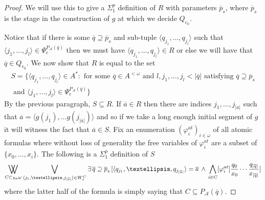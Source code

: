 \documentclass[10pt,a4paper]{amsart}
\newcommand{\A}{{\mathcal{A}}}
\newcommand{\B}{{\mathcal{B}}}
\renewcommand{\bar}[1]{\overline{#1}}
\DeclareMathOperator*{\bigdoublevee}{\bigvee\mkern-15mu\bigvee}
\renewcommand{\phi}{\varphi}
\begin{document}
\begin{proof}
We will use this to give a $\Sigma^p_1$ definition of $R$ with parameters $\bar p_{s}$, where $\bar p_{s}$ is the stage in the construction of $g$ at which we decide $Q_{e_0}$.

Notice that if there is some $\bar q \supseteq \bar p_s$ and sub-tuple $\langle q_{j_1} , \dots, q_{j_l} \rangle$ such that $\langle j_1,\dots , j_l \rangle \in \Psi_e^{P_\A(\overline{q})}$ then we must have $\langle q_{j_1} , \dots, q_{j_l} \rangle \in R$ or else we will have that $\bar q \in Q_{e_0}$. We now show that $R$ is equal to the set
\begin{align*}
    S = \{ \langle q_{j_1},\dots , q_{j_l} \rangle \in A^* : \text{ for some } \bar q \in A^{< \omega} \text{ and } l , j_1, \dots , j_l < |\bar q | \text{ satisfying } \bar q \supseteq \bar p_s \\ \text{ and } \langle j_1 ,\dots , j_l \rangle \in \Psi_e^{P_\A(\bar q)}\}
\end{align*}
By the previous paragraph, $S \subseteq R$. If $\bar a \in R$ then there are indices $j_1,\dots, j_{|\bar a|}$ such that $\bar a = \langle g(j_1), \dots g(j_{|\bar a|}) \rangle$ and so if we take a long enough initial segment of $g$ it will witness the fact that $\bar a \in S$. Fix an enumeration $(\phi_i^{at})_{i\in\omega}$ of all atomic formulas where without loss of generality the free variables of $\phi_i^{at}$ are a subset of $\{x_0,\dots, x_{i}\}$. The following is a $\Sigma^p_1$ definition of $S$
\[
    \bigdoublevee_{ C \subset_{\text{fin}} \omega} \bigvee_{\langle j_1,\dots , j_{|\bar a|} \rangle \in W_e^C} \exists\, \bar q \supseteq \bar p_s \, [\langle q_{j_1}, \dots ,q_{j_{|\bar a|}} \rangle = \bar a \, \wedge \, \bigwedge_{i \in C} [\varphi^{at}_i]\frac{q_0}{x_0}\cdots\frac{q_{|\bar q|}}{x_{|\bar q|}} ]
\]
where the latter half of the formula is simply saying that $C \subseteq P_\A(\bar q)$.
\end{proof}
\end{document}

